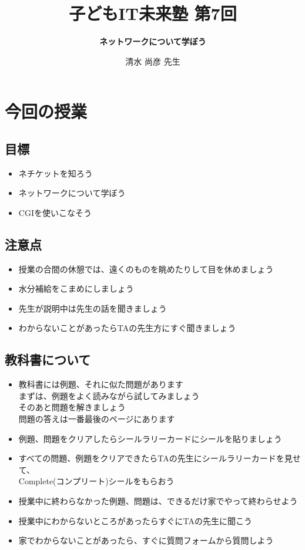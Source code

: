 \documentclass[a4paper,12pt,dvipdfmx]{jarticle}
\title{\vspace{70mm}\Huge 子どもIT未来塾 第7回}
\author{
\huge\bf ネットワークについて学ぼう
\vspace{15mm}
}
\date{%
\Huge 清水 尚彦 先生
}
\begin{document}


\maketitle

\thispagestyle{FirstPage}
\clearpage\section{今回の授業}

\subsection*{目標}
\begin{itemize}
	\item ネチケットを知ろう
	\item ネットワークについて学ぼう
	\item CGIを使いこなそう
\end{itemize}

\subsection*{注意点}
\begin{itemize}
	\item 授業の合間の休憩では、遠くのものを眺めたりして目を休めましょう
	\item 水分補給をこまめにしましょう
	\item 先生が説明中は先生の話を聞きましょう
	\item わからないことがあったらTAの先生方にすぐ聞きましょう
\end{itemize}

\subsection*{教科書について}
\begin{itemize}
\item 教科書には例題、それに似た問題があります\\
まずは、例題をよく読みながら試してみましょう\\
そのあと問題を解きましょう\\
問題の答えは一番最後のページにあります
\item 例題、問題をクリアしたらシールラリーカードにシールを貼りましょう
\item すべての問題、例題をクリアできたらTAの先生にシールラリーカードを見せて、\\
Complete(コンプリート)シールをもらおう
\item 授業中に終わらなかった例題、問題は、できるだけ家でやって終わらせよう
\item 授業中にわからないところがあったらすぐにTAの先生に聞こう
\item 家でわからないことがあったら、すぐに質問フォームから質問しよう
\end{itemize}
\end{document}
